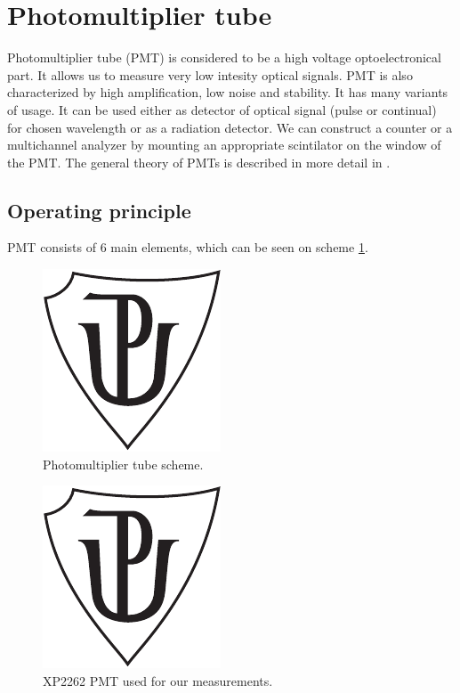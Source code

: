 \section{Photomultiplier tube}
Photomultiplier tube (PMT) is considered to be a high voltage optoelectronical part. It allows us to measure very low intesity optical signals. PMT is also characterized by high amplification, low noise and stability. It has many variants of usage. It can be used either as detector of optical signal (pulse or continual) for chosen wavelength or as a radiation detector. We can construct a counter or a multichannel analyzer by mounting an appropriate scintilator on the window of the PMT. The general theory of PMTs is described in more detail in \cite{Photonis, Hamamatsu}. 
\subsection{Operating principle}
PMT consists of 6 main elements, which can be seen on scheme \ref{PMT scheme}.

\begin{figure}[H]
 \centering
 \includegraphics{up_logo_bw}
 \caption{Photomultiplier tube scheme.}
 \label{PMT scheme}
\end{figure}

\begin{figure}[H]
 \centering
 \includegraphics{up_logo_bw}
 \caption{XP2262 PMT used for our measurements.}
 \label{XP2262 PMT}
\end{figure}

